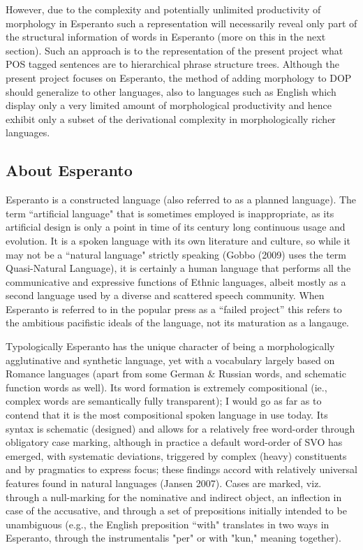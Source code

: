 \documentclass[10pt,a4paper]{article}
\begin{document}
However, due to the complexity and potentially unlimited productivity of
morphology in Esperanto such a representation will necessarily reveal
only part of the structural information of words in Esperanto (more on this
in the next section). Such an approach is to the representation of the present
project what POS tagged sentences are to hierarchical phrase structure trees.
Although the present project focuses on Esperanto, the method of adding
morphology to DOP should generalize to other languages, also to languages
such as English which display only a very limited amount of morphological
productivity and hence exhibit only a subset of the derivational complexity in
morphologically richer languages.

\subsection{About Esperanto}

Esperanto is a constructed language (also referred to as a planned language).
The term ``artificial language" that is sometimes employed is inappropriate, as
its artificial design is only a point in time of its century long continuous
usage and evolution. It is a spoken language with its own literature and
culture, so while it may not  be a ``natural language" strictly speaking (Gobbo
(2009) uses the term Quasi-Natural Language), it is certainly a human language
that performs all the communicative and expressive functions of Ethnic
languages, albeit mostly as a second language used by a diverse and scattered
speech community. When Esperanto is referred to in the popular press as a
``failed project'' this refers to the ambitious pacifistic ideals of the
language, not its maturation as a langauge.

Typologically Esperanto has the unique character of being a morphologically
agglutinative and synthetic language, yet with a vocabulary largely based on
Romance languages (apart from some German \& Russian words, and schematic
function words as well). Its word formation is extremely compositional (ie.,
complex words are semantically fully transparent); I would go as far as to
contend that it is the most compositional spoken language in use today. Its
syntax is schematic (designed) and allows for a relatively free word-order
through obligatory case marking, although in practice a default word-order of
SVO has emerged, with systematic deviations, triggered by complex (heavy)
constituents and by pragmatics to express focus; these findings accord with
relatively universal features found in natural languages (Jansen 2007). Cases
are marked, viz. through a null-marking for the nominative and indirect object,
an inflection in case of the accusative, and through a set of prepositions
initially intended to be unambiguous (e.g., the English preposition ``with"
translates in two ways in Esperanto, through the instrumentalis "per" or with
"kun," meaning together). 
\end{document}
